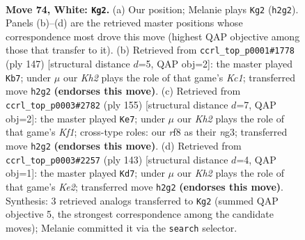 \documentclass[11pt]{article}
\begin{document}
\clearpage

\begin{figure}[p]\centering
\begin{subfigure}{0.46\textwidth}\centering
\resizebox{\linewidth}{!}{%
\newchessgame
\chessboard[
  setfen={5r1k/P2R4/8/8/8/8/7K/8 w - - 17 74},
  showmover=false,
  pgfstyle=straightmove, color=movearrow, markmove={h2-g2}
]}
\caption{}
\end{subfigure}\hfill
\begin{subfigure}{0.46\textwidth}\centering
\resizebox{\linewidth}{!}{%
\newchessgame
\chessboard[
  setfen={2k5/p7/8/8/8/2N5/5K1R/r7 b - - 0 74},
  showmover=false,
  pgfstyle=straightmove, color=movearrow, markmove={c8-b7}
]}
\caption{}
\end{subfigure}
\\[4pt]
\begin{subfigure}{0.46\textwidth}\centering
\resizebox{\linewidth}{!}{%
\newchessgame
\chessboard[
  setfen={5k2/8/8/1R5K/8/p5N1/8/r7 b - - 6 78},
  showmover=false,
  pgfstyle=straightmove, color=movearrow, markmove={f8-e7}
]}
\caption{}
\end{subfigure}\hfill
\begin{subfigure}{0.46\textwidth}\centering
\resizebox{\linewidth}{!}{%
\newchessgame
\chessboard[
  setfen={8/4k3/6R1/p7/8/3P4/6K1/r7 b - - 7 72},
  showmover=false,
  pgfstyle=straightmove, color=movearrow, markmove={e7-d7}
]}
\caption{}
\end{subfigure}
\caption{\textbf{Move 74, White: \texttt{Kg2}.} (a) Our position; Melanie plays \texttt{Kg2} (\texttt{h2g2}). Panels (b)--(d) are the retrieved master positions whose correspondence most drove this move (highest QAP objective among those that transfer to it). (b) Retrieved from \texttt{ccrl\_top\_p0001\#1778} (ply 147) [structural distance $d$=5, QAP obj=2]: the master played \texttt{Kb7}; under $\mu$ our \emph{Kh2} plays the role of that game's \emph{Kc1}; transferred move \texttt{h2g2} \textbf{(endorses this move)}. (c) Retrieved from \texttt{ccrl\_top\_p0003\#2782} (ply 155) [structural distance $d$=7, QAP obj=2]: the master played \texttt{Ke7}; under $\mu$ our \emph{Kh2} plays the role of that game's \emph{Kf1}; cross-type roles: our \emph{r}f8 as their \emph{n}g3; transferred move \texttt{h2g2} \textbf{(endorses this move)}. (d) Retrieved from \texttt{ccrl\_top\_p0003\#2257} (ply 143) [structural distance $d$=4, QAP obj=1]: the master played \texttt{Kd7}; under $\mu$ our \emph{Kh2} plays the role of that game's \emph{Ke2}; transferred move \texttt{h2g2} \textbf{(endorses this move)}. Synthesis: 3 retrieved analogs transferred to \texttt{Kg2} (summed QAP objective 5, the strongest correspondence among the candidate moves); Melanie committed it via the \texttt{search} selector.}
\label{fig:thought-m146}
\end{figure}
\end{document}
